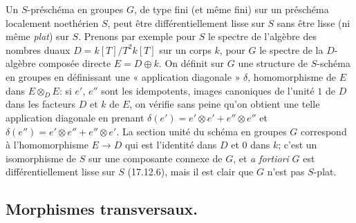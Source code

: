 \begin{remark}[17.12.8]
\label{IV.17.12.8}
Un $S$-préschéma en groupes $G$, de type fini (et même fini) sur un préschéma localement noethérien $S$, peut être différentiellement lisse sur $S$ sans être lisse (ni même \emph{plat}) sur $S$. Prenons par exemple pour $S$ le spectre de l'algèbre des nombres duaux $D=k[T]/T^2k[T]$ sur un corps $k$, pour $G$ le spectre de la $D$-algèbre composée directe $E=D\oplus k$. On définit sur $G$ une structure de $S$-schéma en groupes en définissant une « application diagonale » $\delta$, homomorphisme de $E$ dans $E\otimes_DE$: si $e'$, $e''$ sont les idempotents, images canoniques de l'unité $1$ de $D$ dans les facteurs $D$ et $k$ de $E$, on vérifie sans peine qu'on obtient une telle application diagonale en prenant $\delta(e')=e'\otimes e'+e''\otimes e''$ et $\delta(e'')=e'\otimes e''+e''\otimes e'$.
La section unité du schéma en groupes $G$ correspond à l'homomorphisme $E\to D$ qui est l'identité dans $D$ et $0$ dans $k$; c'est un isomorphisme de $S$ sur une composante connexe de $G$, et \emph{a fortiori} $G$ est différentiellement lisse sur $S$ (17.12.6), mais il est clair que $G$ n'est pas $S$-plat.
\end{remark}

\subsection{Morphismes transversaux.}
\label{IV.17.13}

